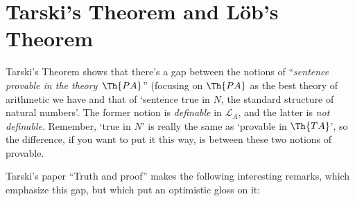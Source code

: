 
\section{Tarski's Theorem and L\"ob's Theorem}

Tarski's Theorem shows that there's a gap between the notions of
``\emph{sentence provable in the theory}~$\Th{PA}$'' (focusing on
$\Th{PA}$ as the best theory of arithmetic we have and that of
`sentence true in $N$, the standard structure of natural numbers'.
The former notion is \emph{definable} in $\mathcal{L}_{A}$, and the
latter is \emph{not definable}. Remember, `true in $N$' is really the
same as `provable in $\Th{TA}$', so the difference, if you want to
put it this way, is between these two notions of provable. 

Tarski's paper ``Truth and proof'' \citep{Tarski1969} makes the
following interesting remarks, which emphasize this gap, but which put
an optimistic gloss on it:

